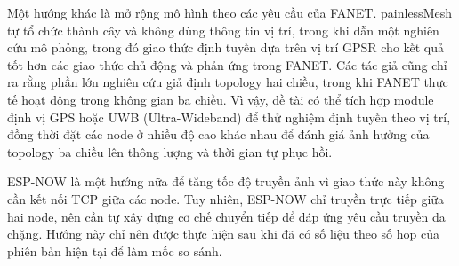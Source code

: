 Một hướng khác là mở rộng mô hình theo các yêu cầu của FANET. painlessMesh tự tổ chức thành cây và không dùng thông tin vị trí, trong khi \citet{bekmezci2013} dẫn một nghiên cứu mô phỏng, trong đó giao thức định tuyến dựa trên vị trí GPSR cho kết quả tốt hơn các giao thức chủ động và phản ứng trong FANET. Các tác giả cũng chỉ ra rằng phần lớn nghiên cứu giả định topology hai chiều, trong khi FANET thực tế hoạt động trong không gian ba chiều. Vì vậy, đề tài có thể tích hợp module định vị GPS hoặc UWB (Ultra-Wideband) để thử nghiệm định tuyến theo vị trí, đồng thời đặt các node ở nhiều độ cao khác nhau để đánh giá ảnh hưởng của topology ba chiều lên thông lượng và thời gian tự phục hồi.

ESP-NOW \citep{espressif_espnow} là một hướng nữa để tăng tốc độ truyền ảnh vì giao thức này không cần kết nối TCP giữa các node. Tuy nhiên, ESP-NOW chỉ truyền trực tiếp giữa hai node, nên cần tự xây dựng cơ chế chuyển tiếp để đáp ứng yêu cầu truyền đa chặng. Hướng này chỉ nên được thực hiện sau khi đã có số liệu theo số hop của phiên bản hiện tại để làm mốc so sánh.
